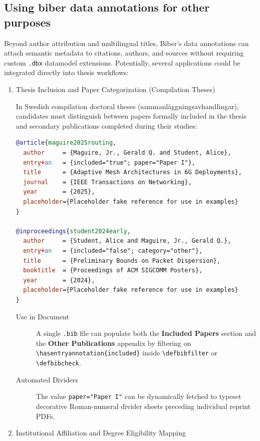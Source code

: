 \documentclass[12pt, twoside]{article}
\newcommand{\fname}[1]{\texttt{#1}}
\begin{document}
\subsection{Using biber data annotations for other purposes}
\label{sec:otherUsesForBiberDataAnotations}

Beyond author attribution and multilingual titles, Biber’s data annotations can attach semantic metadata to citations, authors, and sources without requiring custom \texttt{.dbx} datamodel extensions. Potentially, several applications could be integrated directly into thesis workflows:
\begin{enumerate}
    \item Thesis Inclusion and Paper Categorization (Compilation Theses)

In Swedish compilation doctoral theses (\foreignlanguage{swedish}{sammanläggningsavhandlingar}), candidates must distinguish between papers formally included in the thesis and secondary publications completed during their studies:

\begin{lstlisting}[language={BibTeX}, breaklines=true, basicstyle=\small\ttfamily,  escapechar=|, caption={{Storing thesis related metadata}}, label=lst:biberThesisMetadata]
@article{maguire2025routing,
  author     = {Maguire, Jr., Gerald Q. and Student, Alice},
  entry+an   = {included="true"; paper="Paper I"},
  title      = {Adaptive Mesh Architectures in 6G Deployments},
  journal    = {IEEE Transactions on Networking},
  year       = {2025},
  placeholder={Placeholder fake reference for use in examples}
}

@inproceedings{student2024early,
  author     = {Student, Alice and Maguire, Jr., Gerald Q.},
  entry+an   = {included="false"; category="other"},
  title      = {Preliminary Bounds on Packet Dispersion},
  booktitle  = {Proceedings of ACM SIGCOMM Posters},
  year       = {2024},
  placeholder={Placeholder fake reference for use in examples}
}
\end{lstlisting}
\begin{description}
    \item[Use in Document] A single \fname{.bib} file can populate both the \textbf{Included Papers} section and the \textbf{Other Publications} appendix by filtering on  \texttt{\textbackslash hasentryannotation\{included\}} inside \texttt{\textbackslash defbibfilter} or \texttt{\textbackslash defbibcheck}.
    \item[Automated Dividers] The value \texttt{paper="Paper I"} can be dynamically fetched to typeset decorative Roman-numeral divider sheets preceding individual reprint \glspl{PDF}.
\end{description}
    \item Institutional Affiliation and Degree Eligibility Mapping


\end{enumerate}
\end{document}
